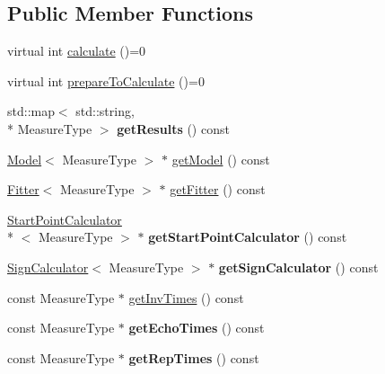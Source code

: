 \subsection*{Public Member Functions}
\begin{DoxyCompactItemize}
\item 
virtual int \hyperlink{class_ox_1_1_calculator_a9638894f2ec526b68f46f02122bae0c3}{calculate} ()=0
\item 
virtual int \hyperlink{class_ox_1_1_calculator_a01267c4e842b35f7eacaa9aacdd7e766}{prepare\-To\-Calculate} ()=0
\item 
\hypertarget{class_ox_1_1_calculator_a4b04d48cb906764aa235c387b631dca4}{std\-::map$<$ std\-::string, \\*
Measure\-Type $>$ {\bfseries get\-Results} () const }\label{class_ox_1_1_calculator_a4b04d48cb906764aa235c387b631dca4}

\item 
\hyperlink{class_ox_1_1_model}{Model}$<$ Measure\-Type $>$ $\ast$ \hyperlink{class_ox_1_1_calculator_a5589bf7b93a2d1e106532c35745f4329}{get\-Model} () const 
\item 
\hyperlink{class_ox_1_1_fitter}{Fitter}$<$ Measure\-Type $>$ $\ast$ \hyperlink{class_ox_1_1_calculator_af648a7c6c957c9f51532f15c93147d62}{get\-Fitter} () const 
\item 
\hypertarget{class_ox_1_1_calculator_ad43fbbb3e888e1fa73f95d872a963bac}{\hyperlink{class_ox_1_1_start_point_calculator}{Start\-Point\-Calculator}\\*
$<$ Measure\-Type $>$ $\ast$ {\bfseries get\-Start\-Point\-Calculator} () const }\label{class_ox_1_1_calculator_ad43fbbb3e888e1fa73f95d872a963bac}

\item 
\hypertarget{class_ox_1_1_calculator_a4ee7fdeb4009d2e433ef6a566768eb25}{\hyperlink{class_ox_1_1_sign_calculator}{Sign\-Calculator}$<$ Measure\-Type $>$ $\ast$ {\bfseries get\-Sign\-Calculator} () const }\label{class_ox_1_1_calculator_a4ee7fdeb4009d2e433ef6a566768eb25}

\item 
const Measure\-Type $\ast$ \hyperlink{class_ox_1_1_calculator_ab844b24dfedd27d52466203ec0c913fa}{get\-Inv\-Times} () const 
\item 
\hypertarget{class_ox_1_1_calculator_a6a46eb89732759c2544398f9a694f5c7}{const Measure\-Type $\ast$ {\bfseries get\-Echo\-Times} () const }\label{class_ox_1_1_calculator_a6a46eb89732759c2544398f9a694f5c7}

\item 
\hypertarget{class_ox_1_1_calculator_a2e708f33e09e1e08345bea3024e99ec1}{const Measure\-Type $\ast$ {\bfseries get\-Rep\-Times} () const }\label{class_ox_1_1_calculator_a2e708f33e09e1e08345bea3024e99ec1}


\end{DoxyCompactItemize}
